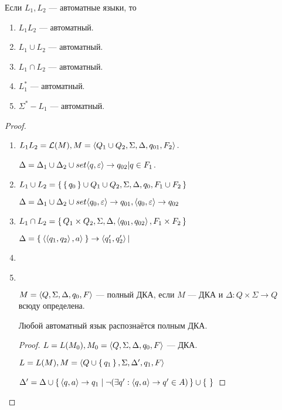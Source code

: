\begin{Th}
  Если $L_1, L_2$ --- автоматные языки, то
  \begin{enumerate}
	\item $L_1L_2$ --- автоматный.
	\item $L_1 \cup L_2$ --- автоматный.
	\item $L_1 \cap L_2$ --- автоматный.
	\item $L_1^*$ --- автоматный.
	\item $\Sigma^* - L_1$ --- автоматный.
  \end{enumerate}

  \begin{proof}
	\begin{enumerate}
	  \item $L_1L_2 = \mathcal{L}(M), M = \braket{Q_1 \cup Q_2, \Sigma, \Delta, q_{01}, F_2}.$

		$\Delta = \Delta_1 \cup \Delta_2 \cup set{\braket{q, \varepsilon} \to q_{02} | q \in F_1}$.

	  \item $L_1 \cup  L_2 = \set{\set{q_0} \cup Q_1 \cup Q_2, \Sigma, \Delta, q_0, F_1 \cup F_2}$

		$\Delta = \Delta_1 \cup \Delta_2 \cup set{\braket{q_0, \varepsilon} \to q_{01}, \braket{q_0, \varepsilon} \to q_{02}}$

	  \item $L_1 \cap L_2 = \set{Q_1 \times Q_2, \Sigma, \Delta, \braket{q_{01}, q_{02}}, F_1 \times F_2}$

		$\Delta = \Set{\braket{\braket{q_1, q_2}, a}} \to \braket{q'_1, q'_2} | 
		\begin{aligned}

		\end{aligned}$

	  \item 

	  \item $ $
		\begin{define*}
		  $M = \braket{Q, \Sigma, \Delta, q_0, F}$ --- полный ДКА, если $M$ --- ДКА и $\Delta: Q \times \Sigma \to Q$ всюду определена.
		\end{define*}
		\begin{claim}
		  Любой автоматный язык распознаётся полным ДКА.
		  \begin{proof}
			$L = L(M_0), M_0 = \braket{Q, \Sigma, \Delta, q_0, F}$ --- ДКА.

			$L = L(M), M = \braket{Q \cup \set{q_1}, \Sigma, \Delta', q_1, F}$

			$\Delta' = \Delta \cup \set{\braket{q, a} \to q_1 | \lnot (\exists q' : \braket{q, a} \to q' \in A)} \cup
			\set{}$
		  \end{proof}
		\end{claim}
	\end{enumerate}
  \end{proof}
\end{Th}

